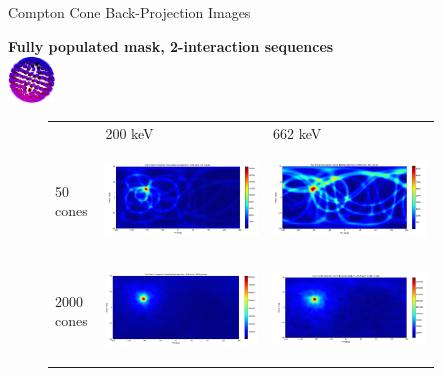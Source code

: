 \documentclass[xcolor=x11names,compress]{beamer}
\renewcommand{\(}{\begin{columns}}
\renewcommand{\)}{\end{columns}}
\newcommand{\<}[1]{\begin{column}{#1}}
\renewcommand{\>}{\end{column}}
\begin{document}
\begin{frame}{Compton Cone Back-Projection Images}

\textbf{Fully populated mask, 2-interaction sequences}\\ [1ex]
\includegraphics[height=35pt, width=35pt]{Figures/FullMask.png}

\vspace{-35pt}
\begin{figure}
\begin{tabular}{m{0.11\linewidth} m{0.4\linewidth} m{0.4\linewidth}}
	& 200 keV & 662 keV \\
	50 cones & \includegraphics[height=75pt, width=135pt]{Figures/Compton_200_50cones.png} & 
	\includegraphics[height=75pt, width=135pt]{Figures/Compton_662_50cones.png} \\
	2000 cones & \includegraphics[height=75pt, width=135pt]{Figures/Compton_200_2000cones.png} & 
	\includegraphics[height=75pt, width=135pt]{Figures/Compton_662_2000cones.png}
\end{tabular}
\end{figure}

\end{frame}
\end{document}
